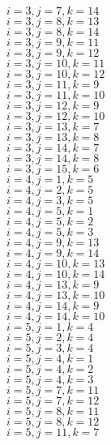 \documentclass[14pt]{article}
\begin{document}
    $i=3,j=7,k=14 $ \\ 
    $i=3,j=8,k=13 $ \\ 
    $i=3,j=8,k=14 $ \\ 
    $i=3,j=9,k=11 $ \\ 
    $i=3,j=9,k=12 $ \\ 
    $i=3,j=10,k=11 $ \\ 
    $i=3,j=10,k=12 $ \\ 
    $i=3,j=11,k=9 $ \\ 
    $i=3,j=11,k=10 $ \\ 
    $i=3,j=12,k=9 $ \\ 
    $i=3,j=12,k=10 $ \\ 
    $i=3,j=13,k=7 $ \\ 
    $i=3,j=13,k=8 $ \\ 
    $i=3,j=14,k=7 $ \\ 
    $i=3,j=14,k=8 $ \\ 
    $i=3,j=15,k=6 $ \\ 
    $i=4,j=1,k=5 $ \\ 
    $i=4,j=2,k=5 $ \\ 
    $i=4,j=3,k=5 $ \\ 
    $i=4,j=5,k=1 $ \\ 
    $i=4,j=5,k=2 $ \\ 
    $i=4,j=5,k=3 $ \\ 
    $i=4,j=9,k=13 $ \\ 
    $i=4,j=9,k=14 $ \\ 
    $i=4,j=10,k=13 $ \\ 
    $i=4,j=10,k=14 $ \\ 
    $i=4,j=13,k=9 $ \\ 
    $i=4,j=13,k=10 $ \\ 
    $i=4,j=14,k=9 $ \\ 
    $i=4,j=14,k=10 $ \\ 
    $i=5,j=1,k=4 $ \\ 
    $i=5,j=2,k=4 $ \\ 
    $i=5,j=3,k=4 $ \\ 
    $i=5,j=4,k=1 $ \\ 
    $i=5,j=4,k=2 $ \\ 
    $i=5,j=4,k=3 $ \\ 
    $i=5,j=7,k=11 $ \\ 
    $i=5,j=7,k=12 $ \\ 
    $i=5,j=8,k=11 $ \\ 
    $i=5,j=8,k=12 $ \\ 
    $i=5,j=11,k=7 $ \\ 
\end{document}
